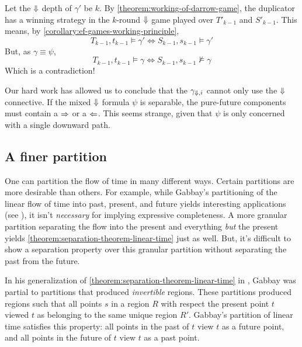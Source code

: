 \documentclass[a4paper,UKenglish,cleveref, autoref, thm-restate, numberwithinsect]{lipics-v2021}
\def\Larrow{\ensuremath\mathord{\Leftarrow}}
\def\Rarrow{\ensuremath\mathord{\Rightarrow}}
\def\Darrow{\ensuremath\mathord{\Downarrow}}
\begin{document}
Let the $\Darrow$ depth of $\gamma'$ be $k$. By \cref{theorem:working-of-darrow-game}, the duplicator has a winning strategy in the $k$-round $\Darrow$ game played over $T'_{k - 1}$ and $S'_{k - 1}$. This means, by \cref{corollary:ef-games-working-principle},
\begin{equation*}
    T_{k-1}, t_{k-1} \vDash \gamma' \Longleftrightarrow S_{k-1}, s_{k-1} \vDash \gamma'
\end{equation*}
But, as $\gamma \equiv \psi$,
\begin{equation*}
    T_{k-1}, t_{k-1} \vDash \gamma \Longleftrightarrow S_{k-1}, s_{k-1} \nvDash \gamma
\end{equation*}
Which is a contradiction!

Our hard work has allowed us to conclude that the $\gamma_{\Darrow, i}$ cannot only use the $\Darrow$ connective. If the mixed $\Darrow$ formula $\psi$ is separable, the pure-future components must contain a $\Rarrow$ or a $\Larrow$. This seems strange, given that $\psi$ is only concerned with a single downward path.

\subsection{A finer partition}
\label{sec:finer-partition}

One can partition the flow of time in many different ways. Certain partitions are more desirable than others. For example, while Gabbay's partitioning of the linear flow of time into past, present, and future yields interesting applications (see \cite{DecPastImpFuture89}), it isn't \textit{necessary} for implying expressive completeness. A more granular partition separating the flow into the present and everything \textit{but} the present yields \cref{theorem:separation-theorem-linear-time} just as well. But, it's difficult to show a separation property over this granular partition without separating the past from the future.

In his generalization of \cref{theorem:separation-theorem-linear-time} in \cite{gabbay1994}, Gabbay was partial to partitions that produced \textit{invertible} regions. These partitions produced regions such that all points $s$ in a region $R$ with respect the present point $t$ viewed $t$ as belonging to the same unique region $R'$. Gabbay's partition of linear time satisfies this property: all points in the past of $t$ view $t$ as a future point, and all points in the future of $t$ view $t$ as a past point.
\end{document}
